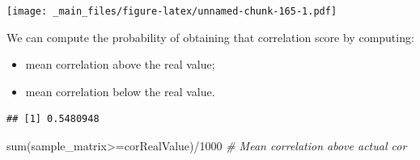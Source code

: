 \documentclass[
  notitlepage,
  onecolumn,
  openany]{book}
\newenvironment{Shaded}{\begin{snugshade}}{\end{snugshade}}
\newcommand{\AttributeTok}[1]{\textcolor[rgb]{0.77,0.63,0.00}{#1}}
\newcommand{\CommentTok}[1]{\textcolor[rgb]{0.56,0.35,0.01}{\textit{#1}}}
\newcommand{\DecValTok}[1]{\textcolor[rgb]{0.00,0.00,0.81}{#1}}
\newcommand{\DocumentationTok}[1]{\textcolor[rgb]{0.56,0.35,0.01}{\textbf{\textit{#1}}}}
\newcommand{\FunctionTok}[1]{\textcolor[rgb]{0.00,0.00,0.00}{#1}}
\newcommand{\NormalTok}[1]{#1}
\newcommand{\OtherTok}[1]{\textcolor[rgb]{0.56,0.35,0.01}{#1}}
\newcommand{\SpecialCharTok}[1]{\textcolor[rgb]{0.00,0.00,0.00}{#1}}
\newcommand{\StringTok}[1]{\textcolor[rgb]{0.31,0.60,0.02}{#1}}
\providecommand{\tightlist}{%
  \setlength{\itemsep}{0pt}\setlength{\parskip}{0pt}}
\begin{document}
\begin{Shaded}
\end{Shaded}

\texttt{[image: \_main\_files/figure-latex/unnamed-chunk-165-1.pdf]}

We can compute the probability of obtaining that correlation score by computing:

\begin{itemize}
\tightlist
\item
  mean correlation above the real value;
\item
  mean correlation below the real value.
\end{itemize}

\begin{Shaded}
\end{Shaded}

\begin{verbatim}
## [1] 0.5480948
\end{verbatim}

\begin{Shaded}
\begin{Highlighting}[]
\FunctionTok{sum}\NormalTok{(sample\_matrix}\SpecialCharTok{\textgreater{}=}\NormalTok{corRealValue)}\SpecialCharTok{/}\DecValTok{1000} \CommentTok{\# Mean correlation above actual cor}
\end{Highlighting}
\end{Shaded}
\end{document}
